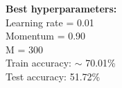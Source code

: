 \documentclass{article}
\newcommand{\1}{\mathbf{1}}
\begin{document}
{\begin{figure}[h]
  \centering
\end{figure}

\newpage 

\textbf{Best hyperparameters:} \\
Learning rate = 0.01 \\
Momentum = 0.90 \\
M = 300 \\
Train accuracy: $\sim$ 70.01\%\\
Test accuracy: 51.72\%

}
\end{document}
